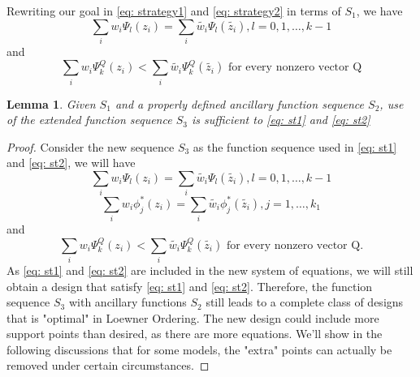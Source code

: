 \documentclass[11pt]{amsart}
\newtheorem{lemma}[theorem]{Lemma}
\theoremstyle{definition}
\theoremstyle{remark}
\numberwithin{equation}{section}
\begin{document}
Rewriting our goal in \eqref{eq: strategy1} and \eqref{eq: strategy2} in terms of $S_1$, we have  
\begin{equation} \label{eq: st1}
\sum_{i}w_i\Psi_l(z_i)=\sum_{i}\tilde{w_i}\Psi_l(\tilde{z_i}), l=0,1,\ldots, k-1
\end{equation} and \begin{equation} \label{eq: st2}
\sum_{i}w_i\Psi_k^Q(z_i)<\sum_{i}\tilde{w_i}\Psi_k^Q(\tilde{z_i}) \text{  for every nonzero vector Q}
\end{equation}  
\begin{lemma}
Given $S_1$ and a properly defined ancillary function sequence $S_2$, use of the extended function sequence $S_3$ is sufficient to \eqref{eq: st1} and \eqref{eq: st2}
\end{lemma}
\begin{proof}
Consider the new sequence $S_3$ as the function sequence used in \eqref{eq: st1} and \eqref{eq: st2}, we will have \begin{equation}\label{eq: added1}
\sum_{i}w_i\Psi_l(z_i)=\sum_{i}\tilde{w_i}\Psi_l(\tilde{z_i}), l=0,1,\ldots, k-1    
\end{equation}
\begin{equation}\label{eq: added2}
\sum_{i}w_i\phi_j^*(z_i)=\sum_{i}\tilde{w_i}\phi_j^*(\tilde{z_i}), j=1,\ldots, k_1    
\end{equation}and \begin{equation}\label{eq: added3}
\sum_{i}w_i\Psi_k^Q(z_i)<\sum_{i}\tilde{w_i}\Psi_k^Q(\tilde{z_i}) \text{  for every nonzero vector Q}.
\end{equation} 
As \eqref{eq: st1} and \eqref{eq: st2} are included in the new system of equations, we will still obtain a design that satisfy \eqref{eq: st1} and \eqref{eq: st2}. Therefore, the function sequence $S_3$ with ancillary functions $S_2$ still leads to a complete class of designs that is "optimal" in Loewner Ordering. The new design could include more support points than desired, as there are more equations. We'll show in the following discussions that for some models, the "extra" points can actually be removed under certain circumstances.
\end{proof}


\end{document}
